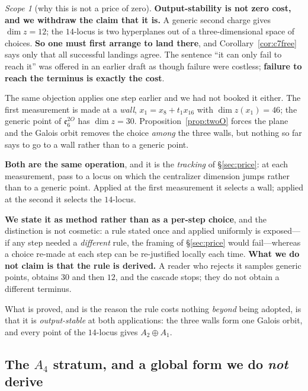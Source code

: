 \documentclass[11pt,reqno]{amsart}
\theoremstyle{plain}
\theoremstyle{definition}
\theoremstyle{remark}
\newtheorem{scope}[theorem]{Scope}
\newcommand{\ee}{\mathfrak{e}}
\begin{document}
\begin{scope}[why this is not a price of zero]\label{sc:c7price}
\textbf{Output-stability is not zero cost, and we withdraw the claim that it is.} A
generic second charge gives $\dim z=12$; the $14$-locus is two hyperplanes out of a
three-dimensional space of choices. \textbf{So one must first arrange to land there},
and Corollary~\ref{cor:c7free} says only that all successful landings agree. The
sentence ``it can only fail to reach it'' was offered in an earlier draft as though
failure were costless; \textbf{failure to reach the terminus is exactly the cost}.

The same objection applies one step earlier and we had not booked it either. The first
measurement is made at a \emph{wall}, $x_1=x_8+t_1x_{16}$ with $\dim z(x_1)=46$; the
generic point of $\ee_6^{2O}$ has $\dim z=30$. Proposition~\ref{prop:twoO} forces the
plane and the Galois orbit removes the choice \emph{among} the three walls, but nothing
so far says to go to a wall rather than to a generic point.

\textbf{Both are the same operation}, and it is the \emph{tracking} of
\S\ref{sec:price}: at each measurement, pass to a locus on which the centralizer
dimension jumps rather than to a generic point. Applied at the first measurement it
selects a wall; applied at the second it selects the $14$-locus.

\textbf{We state it as method rather than as a per-step choice}, and the distinction is
not cosmetic: a rule stated once and applied uniformly is exposed---if any step needed a
\emph{different} rule, the framing of \S\ref{sec:price} would fail---whereas a choice
re-made at each step can be re-justified locally each time. \textbf{What we do not claim
is that the rule is derived.} A reader who rejects it samples generic points, obtains
$30$ and then $12$, and the cascade stops; they do not obtain a different terminus.

What is proved, and is the reason the rule costs nothing \emph{beyond} being adopted, is
that it is \emph{output-stable} at both applications: the three walls form one Galois
orbit, and every point of the $14$-locus gives $A_2\oplus A_1$.
\end{scope}

\subsection{The $A_4$ stratum, and a global form we do \emph{not} derive}\label{sec:globalform}
\end{document}
